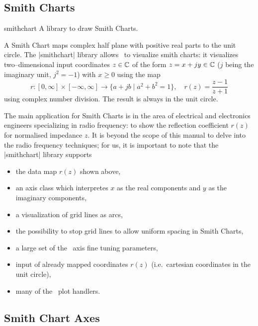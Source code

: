\subsection{Smith Charts}

\begin{pgfplotslibrary}{smithchart}
	A library to draw Smith Charts.

	A Smith Chart maps complex half plane with positive real parts to the unit circle. The |smithchart| library allows \PGFPlots\ to visualize smith charts: it visualizes two--dimensional input coordinates $z \in \mathbb{C} $ of the form $z = x+ j y \in \mathbb{C}$ ($j$ being the imaginary unit, $j^2=-1$) with $x \ge 0$ using the map
	\[ r\colon [0,\infty] \times [-\infty,\infty] \to \{ a+j b \;\vert\;  a^2 + b^2 = 1 \}, \quad r(z) = \frac{z-1}{z+1} \]
	using complex number division. The result is always in the unit circle.

	The main application for Smith Charts is in the area of electrical and electronics engineers specializing in radio frequency: to show the reflection coefficient $r(z)$ for normalised impedance $z$. It is beyond the scope of this manual to delve into the radio frequency techniques; for us, it is important to note that the |smithchart| library supports
	\begin{itemize}
		\item the data map $r(z)$ shown above,
		\item an axis class which interpretes $x$ as the real components and $y$ as the imaginary components,
		\item a visualization of grid lines as arcs,
		\item the possibility to stop grid lines to allow uniform spacing in Smith Charts,
		\item a large set of the \PGFPlots\ axis fine tuning parameters,
		\item input of already mapped coordinates $r(z)$ (i.e.\ cartesian coordinates in the unit circle),
		\item many of the \PGFPlots\ plot handlers.
	\end{itemize}
\end{pgfplotslibrary}

\subsection{Smith Chart Axes}

